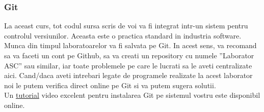\documentclass[a4paper,10pt]{article}
\begin{document}
\subsubsection{Git}
La aceast curs, tot codul sursa scris de voi va fi integrat intr-un sistem pentru controlul versiunilor.
Aceasta este o practica standard in industria software. Munca din timpul laboratoarelor va fi salvata
pe Git. In acest sens, va recomand sa va faceti un cont pe Github, sa va creati un repository cu
numele ”Laborator ASC” sau similar, iar toate problemele pe care le lucrati sa le aveti centralizate
aici. Cand/daca aveti intrebari legate de programele realizate la acest laborator noi le putem verifica
direct online pe Git si va putem sugera solutii. \\
Un \href{https://www.youtube.com/playlist?list=PL4cUxeGkcC9goXbgTDQ0n_4TBzOO0ocPR}{tutorial} video excelent pentru instalarea Git pe sistemul vostru este disponibil online.
\end{document}
